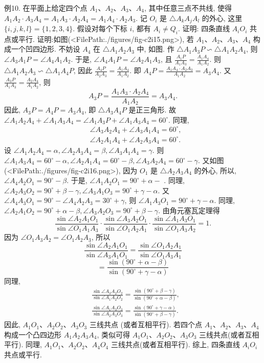 例10. 在平面上给定四个点 $A_1 、 A_2 、 A_3 、 A_4$, 其中任意三点不共线, 使得 $A_1 A_2 \cdot A_3 A_4=A_1 A_3 \cdot A_2 A_4=A_1 A_4 \cdot A_2 A_3$.
记 $O_i$ 是 $\triangle A_k A_j A_l$ 的外心, 这里 $\{i, j, k, l\}=\{1,2,3,4\}$. 假设对每个下标 $i$, 都有 $A_i \neq Q_i$. 证明: 四条直线 $A_i O_i$ 共点或平行.
证明:如图(<FilePath:./figures/fig-c2i15.png>), 若 $A_1 、 A_2 、 A_3 、 A_4$ 构成一个凹四边形.
不妨设 $A_4$ 在 $\triangle A_1 A_2 A_3$ 中, 如图.
作 $\triangle A_1 A_3 P \backsim \triangle A_1 A_2 A_4$, 则 $\angle A_3 A_1 P=\angle A_4 A_1 A_2$.
于是, $\angle A_4 A_1 P=\angle A_2 A_1 A_3$, 且 $\frac{A_1 P}{A_1 A_3}=\frac{A_1 A_4}{A_1 A_2}$.
则 $\triangle A_1 A_2 A_3 \backsim \triangle A_1 A_4 P$, 因此 $\frac{A_4 P}{A_2 A_3}=\frac{A_1 A_4}{A_1 A_2}$.
即 $A_4 P=\frac{A_1 A_4 \cdot A_2 A_3}{A_1 A_2}=A_3 A_4$.
又 $\frac{A_3 P}{A_1 A_3}=\frac{A_2 A_4}{A_1 A_2}$, 则
$$
A_3 P=\frac{A_1 A_3 \cdot A_2 A_4}{A_1 A_2}=A_3 A_4 .
$$
因此, $A_3 P=A_4 P=A_3 A_4$, 即 $\triangle A_3 A_4 P$ 是正三角形.
故 $\angle A_1 A_2 A_4+\angle A_1 A_3 A_4=\angle A_1 A_3 P+\angle A_1 A_3 A_4=60^{\circ}$.
同理,
$$
\begin{aligned}
& \angle A_3 A_2 A_4+\angle A_3 A_1 A_4=60^{\circ}, \\
& \angle A_2 A_1 A_4+\angle A_2 A_3 A_4=60^{\circ} .
\end{aligned}
$$
设 $\angle A_1 A_2 A_4=\alpha, \angle A_2 A_3 A_4=\beta, \angle A_3 A_1 A_4=\gamma$.
则 $\angle A_1 A_3 A_4=60^{\circ}-\alpha, \angle A_2 A_1 A_4=60^{\circ}-\beta, \angle A_3 A_2 A_4=60^{\circ}-\gamma$.
又如图(<FilePath:./figures/fig-c2i16.png>), 因为 $O_1$ 是 $\triangle A_2 A_3 A_4$ 的外心, 所以, $\angle A_4 A_2 O_1=90^{\circ}-\beta$. 于是, $\angle A_1 A_2 O_1=90^{\circ}+\alpha-$ . 同理, $\angle A_2 A_3 O_2=90^{\circ}+\beta-\gamma, \angle A_3 A_1 O_3=90^{\circ}+ \gamma-\alpha$. 又 $\angle A_4 A_3 O_1=90^{\circ}-\angle A_4 A_2 A_3=30^{\circ}+\gamma$, 则 $\angle A_1 A_3 O_1=90^{\circ}+\gamma-\alpha$.
同理, $\angle A_2 A_1 O_2=90^{\circ}+\alpha-\beta, \angle A_3 A_2 O_3= 90^{\circ}+\beta-\gamma$.
由角元塞瓦定理得
$$
\frac{\sin \angle A_2 A_1 O_1}{\sin \angle O_1 A_1 A_3} \cdot \frac{\sin \angle A_3 A_2 O_1}{\sin \angle O_1 A_2 A_1} \cdot \frac{\sin \angle A_1 A_3 O_1}{\sin \angle O_1 A_3 A_2}=1 .
$$
因为 $\angle O_1 A_3 A_2=\angle O_1 A_2 A_3$, 所以
$$
\frac{\sin \angle A_2 A_1 O_1}{\sin \angle A_3 A_1 O_1}=\frac{\sin \angle O_1 A_2 A_1}{\sin \angle O_1 A_3 A_1}
$$
$$
=\frac{\sin \left(90^{\circ}+\alpha-\beta\right)}{\sin \left(90^{\circ}+\gamma-\alpha\right)}
$$
同理,
$$
\begin{aligned}
& \frac{\sin \angle A_3 A_2 O_2}{\sin \angle A_1 A_2 O_2}=\frac{\sin \left(90^{\circ}+\beta-\gamma\right)}{\sin \left(90^{\circ}+\alpha-\beta\right)}, \\
& \frac{\sin \angle A_1 A_3 O_3}{\sin \angle A_2 A_3 O_3}=\frac{\sin \left(90^{\circ}+\gamma-\alpha\right)}{\sin \left(90^{\circ}+\beta-\gamma\right)} .
\end{aligned}
$$
因此, $A_1 O_1 、 A_2 O_2 、 A_3 O_3$ 三线共点 (或者互相平行).
若四个点 $A_1 、 A_2 、 A_3 、 A_4$ 构成一个凸四边形 $A_1 A_2 A_3 A_4$, 类似可得 $A_1 O_1 、 A_2 O_2 、 A_3 O_3$ 三线共点(或者互相平行).
同理, $A_1 O_1 、 A_2 O_2 、 A_4 O_4$ 三线共点(或者互相平行).
综上, 四条直线 $A_i O_i$ 共点或平行.



